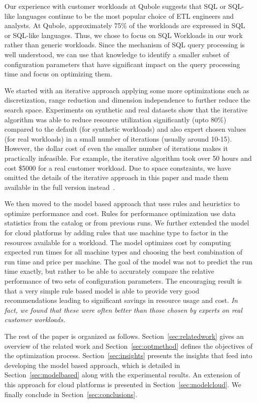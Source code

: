 Our experience with customer workloads at Qubole suggests that SQL or SQL-like languages continue to be the most popular choice of ETL engineers and analysts. At Qubole, approximately 75\% of the workloads are expressed in SQL or SQL-like languages. Thus, we chose to focus on SQL Workloads in our work rather than generic workloads. Since the mechanism of SQL query processing is well understood, we can use that knowledge to identify a smaller subset of configuration parameters that have significant impact on the query processing time and focus on optimizing them. 


We started with an iterative approach applying some more optimizations such as discretization, range reduction and dimension independence to further reduce the search space. Experiments on synthetic and real datasets show that the iterative algorithm was able to reduce resource utilization significantly (upto 80\%) compared to the default (for synthetic workloads) and also expert chosen values (for real workloads) in a small number of iterations (usually around 10-15). However, the dollar cost of even the smaller number of iterations makes it practically infeasible. For example, the iterative algorithm took over 50 hours and cost \$5000 for a real customer workload. Due to space constraints, we have omitted the details of the iterative approach in this paper and made them available in the full version instead~\cite{fullpaper}.

We then moved to the model based approach that uses rules and heuristics to optimize performance and cost. Rules for performance optimization use data statistics from the catalog or from previous runs. We further extended the model for cloud platforms by adding rules that use machine type to factor in the resources available for a workload. The model optimizes cost by computing expected run times for all machine types and choosing the best combination of run time and price per machine. The goal of the model was not to predict the run time exactly, but rather to be able to accurately compare the relative performance of two sets of configuration parameters. The encouraging result is that a very simple rule based model is able to provide very good recommendations leading to significant savings in resource usage and cost. \textit{In fact, we found that these were often better than those chosen by experts on real customer workloads.}

The rest of the paper is organized as follows. Section~\ref{sec:relatedwork} gives an overview of the related work and Section~\ref{sec:optmethod} defines the objectives of the optimization process.  Section~\ref{sec:insights} presents the insights that feed into developing the model based approach, which is detailed in Section~\ref{sec:modelbased} along with the experimental results. An extension of this approach for cloud platforms is presented in Section~\ref{sec:modelcloud}. We finally conclude in Section~\ref{sec:conclusions}.

